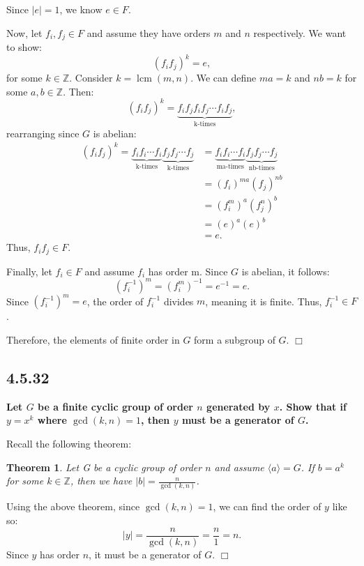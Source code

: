 \documentclass[11pt, a4paper]{article}
\newtheorem{theorem}{Theorem}
\DeclareMathOperator{\lcm}{lcm}
\begin{document}
Since $|e| = 1$, we know $e \in F$.

Now, let $f_{i}, f_{j} \in F$ and assume they have orders $m$ and $n$ respectively. We want to show:
\[
  (f_{i} f_{j})^{k} = e,
\]
for some $k \in \mathbb{Z}$. Consider $k = \lcm(m, n)$. We can define $ma = k$ and $nb = k$ for some $a, b \in \mathbb{Z}$. Then:
\[
  (f_{i} f_{j})^k = \underbrace{f_{i} f_{j} f_{i} f_{j} \cdots f_{i} f_{j}}_{\text{k-times}},
\]
rearranging since $G$ is abelian:
\begin{align*}
  (f_{i} f_{j})^k = \underbrace{f_{i} f_{i} \cdots f_{i}}_{\text{k-times}} \underbrace{f_{j} f_{j} \cdots f_{j}}_{\text{k-times}} &= \underbrace{f_{i} f_{i} \cdots f_{i}}_{\text{ma-times}} \underbrace{f_{j} f_{j} \cdots f_{j}}_{\text{nb-times}} \\
                                        &= (f_{i})^{ma} (f_{j})^{nb} \\
                                        &= (f_{i}^m)^{a} (f_{j}^n)^{b} \\
                                        &= (e)^{a} (e)^{b} \\
                                        &= e.
\end{align*}
Thus, $f_{i} f_{j} \in F$.

\newpage

Finally, let $f_{i} \in F$ and assume $f_{i}$ has order m. Since $G$ is abelian, it follows:
\[
  (f_{i}^{-1})^m = (f_{i}^{m})^{-1} = e^{-1} = e.
\]
Since $(f_{i}^{-1})^m = e$, the order of $f_{i}^{-1}$ divides $m$, meaning it is finite. Thus, $f_{i}^{-1} \in F$.

Therefore, the elements of finite order in $G$ form a subgroup of $G$. $\Box$

\subsection{4.5.32}
\textbf{Let $G$ be a finite cyclic group of order $n$ generated by $x$. Show that if $y = x^k$ where $\gcd(k, n) = 1$, then $y$ must be a generator of $G$.}

Recall the following theorem:
\begin{theorem}
  Let G be a cyclic group of order $n$ and assume $\langle a \rangle = G$. If $b = a^k$ for some $k \in \mathbb{Z}$, then we have $|b| = \frac{n}{\gcd(k, n)}$.
\end{theorem}

Using the above theorem, since $\gcd(k, n) = 1$, we can find the order of $y$ like so:
\[
  |y| = \frac{n}{\gcd(k, n)} = \frac{n}{1} = n.
\]
Since $y$ has order $n$, it must be a generator of $G$. $\Box$
\end{document}
